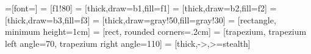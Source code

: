 \usepackage{mathpazo}
\renewcommand*\rmdefault{ppl}
\usepackage[scaled=.95]{helvet}
\renewcommand*\sfdefault{phv}
\renewcommand*\ttdefault{lmtt}

\newcommand{\rmt}[1]{{\rmfamily\large{#1}}} 

\usepackage{xcolor}

\usepackage{tikz}
=[font=\sffamily \large]
\usetikzlibrary{shapes,arrows,positioning,calc,decorations.markings,backgrounds}
 = [f1!80]
 = [thick,draw=b1,fill=f1]
 = [thick,draw=b2,fill=f2]
 = [thick,draw=b3,fill=f3]
 = [thick,draw=gray!50,fill=gray!30]
 = [rectangle, minimum height=1cm]
 = [rect, rounded corners=.2cm]
 = [trapezium, trapezium left angle=70, trapezium right angle=110]
 = [thick,->,>=stealth]